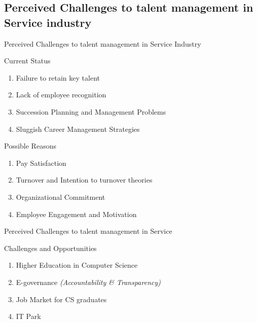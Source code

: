 \subsection{Perceived Challenges to talent management in Service industry}

\begin{frame}{{Perceived Challenges to talent management in Service Industry}}
    \begin{exampleblock}
        {Current Status}
        \begin{enumerate}
            \item Failure to retain key talent
            \item Lack of employee recognition
            \item Succession Planning and Management Problems
            \item Sluggish Career Management Strategies
            
        \end{enumerate}
        
    \end{exampleblock}
    \begin{alertblock}
         {Possible Reasons}
         \begin{enumerate}
             \item Pay Satisfaction
             \item Turnover and Intention to turnover theories
             \item Organizational Commitment
             \item Employee Engagement and Motivation
         \end{enumerate}
    \end{alertblock}
\end{frame}
\begin{frame}{Perceived Challenges to talent management in Service}
    \begin{alertblock}
        {Challenges and Opportunities}
        \begin{enumerate}
            \item Higher Education in Computer Science
            \item E-governance \textit{(Accountability \& Transparency)}
            \item Job Market for CS graduates
            \item IT Park
        \end{enumerate}
    \end{alertblock}
\end{frame}

